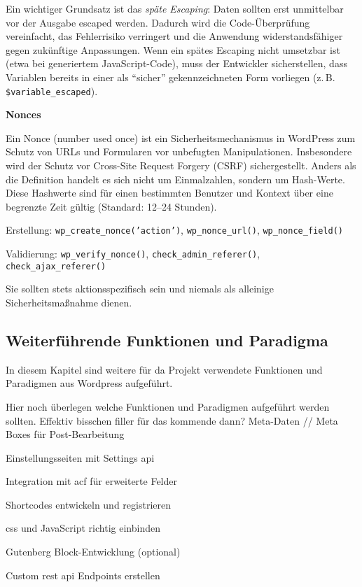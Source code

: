 Ein wichtiger Grundsatz ist das \emph{späte Escaping}: Daten sollten erst unmittelbar vor der Ausgabe escaped werden.
Dadurch wird die Code-Überprüfung vereinfacht, das Fehlerrisiko verringert und die Anwendung widerstandsfähiger gegen zukünftige Anpassungen.
Wenn ein spätes Escaping nicht umsetzbar ist (etwa bei generiertem JavaScript-Code), muss der Entwickler sicherstellen, dass Variablen bereits in einer als \enquote{sicher} gekennzeichneten Form vorliegen (z.\,B. \texttt{\$variable\_escaped}).

\textbf{Nonces}

Ein Nonce (number used once) ist ein Sicherheitsmechanismus in WordPress zum Schutz von URLs und Formularen vor unbefugten Manipulationen.
Insbesondere wird der Schutz vor Cross-Site Request Forgery (CSRF) sichergestellt.
Anders als die Definition handelt es sich nicht um Einmalzahlen, sondern um Hash-Werte.
Diese Hashwerte sind für einen bestimmten Benutzer und Kontext über eine begrenzte Zeit gültig (Standard: 12–24 Stunden).

Erstellung: \texttt{wp\_create\_nonce('action')}, \texttt{wp\_nonce\_url()}, \texttt{wp\_nonce\_field()}

Validierung: \texttt{wp\_verify\_nonce()}, \texttt{check\_admin\_referer()}, \texttt{check\_ajax\_referer()}

Sie sollten stets aktionsspezifisch sein und niemals als alleinige Sicherheitsmaßnahme dienen.





\subsection{Weiterführende Funktionen und Paradigma}
In diesem Kapitel sind weitere für da Projekt verwendete Funktionen und Paradigmen aus Wordpress aufgeführt.


Hier noch überlegen welche Funktionen und Paradigmen aufgeführt werden sollten. Effektiv bisschen filler für das kommende dann?
Meta-Daten // Meta Boxes für Post-Bearbeitung

Einstellungsseiten mit Settings \gls{api}

Integration mit \gls{acf} für erweiterte Felder

Shortcodes entwickeln und registrieren

\gls{css} und JavaScript richtig einbinden

Gutenberg Block-Entwicklung (optional)

Custom \gls{rest} \gls{api} Endpoints erstellen

